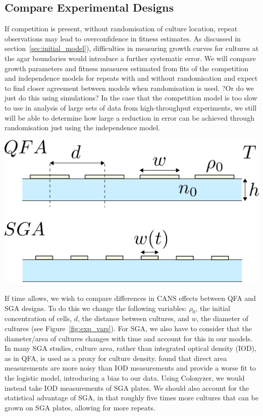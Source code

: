 \subsection{Compare Experimental Designs}
\label{sec:comp-exper-designs}

If competition is present, without randomisation of culture location,
repeat observations may lead to overconfidence in fitness
estimates. As discussed in section~\ref{sec:initial_model}),
difficulties in measuring growth curves for cultures at the agar
boundaries would introduce a further systematic error. We will compare
growth parameters and fitness measures estimated from fits of the
competition and independence models for repeats with and without
randomisation and expect to find closer agreement between models when
randomisation is used. ?Or do we just do this using simulations? In
the case that the competition model is too slow to use in analysis of
large sets of data from high-throughput experiments, we still will be
able to determine how large a reduction in error can be achieved
through randomisation just using the independence model.

\begin{Figure}
  \centering
  \includegraphics[width=\linewidth]{qfa_v_sga_vars}
  \label{fig:exp_vars}
\end{Figure}

If time allows, we wish to compare differences in CANS effects
between QFA and SGA designs. To do this we change the following variables:
\(\rho_{0}\), the initial concentration of cells, \(d\), the distance
between cultures, and \(w\), the diameter of cultures (see
Figure~\ref{fig:exp_vars}). For SGA, we also have to consider that the
diameter/area of cultures changes with time and account for this in
our models. In many SGA studies, culture area, rather than integrated
optical density (IOD), as in QFA, is used as a proxy for culture
density. \citet{Lawless2010} found that direct area measurements are
more noisy than IOD measurements and provide a worse fit to the
logistic model, introducing a bias to our data. Using
Colonyzer, we would instead take IOD measurements of SGA plates. We
should also account for the statistical advantage of SGA, in that
roughly five times more cultures that can be grown on SGA plates,
allowing for more repeats.

